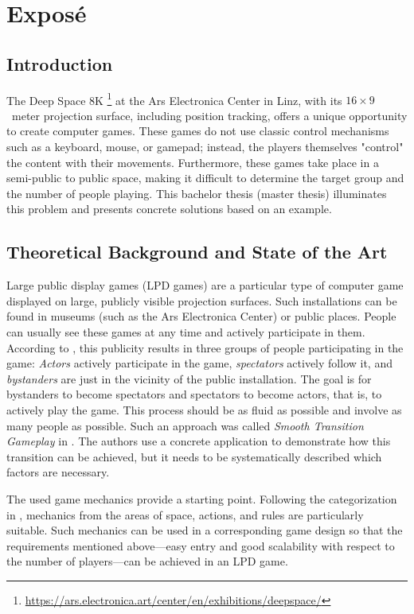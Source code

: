 \chapter{Exposé}

\section{Introduction}

The Deep Space 8K%
\footnote{\url{https://ars.electronica.art/center/en/exhibitions/deepspace/}}
at the Ars Electronica Center in Linz, with its $16 \times 9$~meter projection
surface, including position tracking, offers a unique opportunity to create
computer games. These games do not use classic control mechanisms such as a
keyboard, mouse, or gamepad; instead, the players themselves "control" the
content with their movements. Furthermore, these games take place in a
semi-public to public space, making it difficult to determine the target group
and the number of people playing. This bachelor thesis (master thesis)
illuminates this problem and presents concrete solutions based on an example.


\section{Theoretical Background and State of the Art}
\label{sec:state-of-the-art}

Large public display games (LPD games) are a particular type of computer game
displayed on large, publicly visible projection surfaces. Such installations can
be found in museums (such as the Ars Electronica Center) or public places.
People can usually see these games at any time and actively participate in them.
According to \cite{Finke2008}, this publicity results in three groups of people
participating in the game: \emph{Actors} actively participate in the game,
\emph{spectators} actively follow it, and \emph{bystanders} are just in the
vicinity of the public installation. The goal is for bystanders to become
spectators and spectators to become actors, that is, to actively play the game.
This process should be as fluid as possible and involve as many people as
possible. Such an approach was called \emph{Smooth Transition Gameplay} in
\cite{Hochleitner2013}. The authors use a concrete application to demonstrate
how this transition can be achieved, but it needs to be systematically described
which factors are necessary.

The used game mechanics provide a starting point. Following the categorization
in \cite{Schell2019}, mechanics from the areas of space, actions, and rules are
particularly suitable. Such mechanics can be used in a corresponding game design
so that the requirements mentioned above---easy entry and good scalability with
respect to the number of players---can be achieved in an LPD game.


